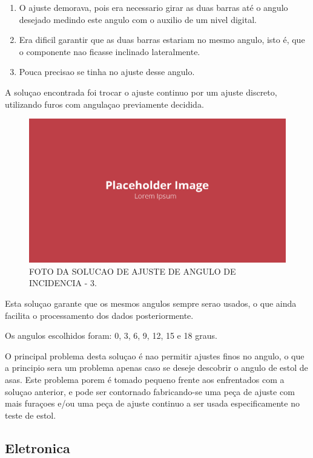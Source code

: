 \begin{enumerate}
    \item O ajuste demorava, pois era necessario girar as duas barras até o angulo desejado medindo este angulo com o auxilio de um nivel digital.
    \item Era dificil garantir que as duas barras estariam no mesmo angulo, isto é, que o componente nao ficasse inclinado lateralmente.
    \item Pouca precisao se tinha no ajuste desse angulo.
\end{enumerate}

A soluçao encontrada foi trocar o ajuste continuo por um ajuste discreto, utilizando furos com angulaçao previamente decidida.

\begin{figure}[!ht]
    \centering
    \includegraphics[width=.8\linewidth]{figuras/placeholder.png}
    \caption{FOTO DA SOLUCAO DE AJUSTE DE ANGULO DE INCIDENCIA - 3\cite{autor}.}
    \label{fig:placeholder}
\end{figure}

Esta soluçao garante que os mesmos angulos sempre serao usados, o que ainda facilita o processamento dos dados posteriormente.

Os angulos escolhidos foram: 0, 3, 6, 9, 12, 15 e 18 graus.

O principal problema desta soluçao é nao permitir ajustes finos no angulo, o que a principio sera um problema apenas caso se deseje descobrir o angulo de estol de asas. Este problema porem é tomado pequeno frente aos enfrentados com a soluçao anterior, e pode ser contornado fabricando-se uma peça de ajuste com mais furaçoes e/ou uma peça de ajuste continuo a ser usada especificamente no teste de estol.

\subsection{Eletronica}

